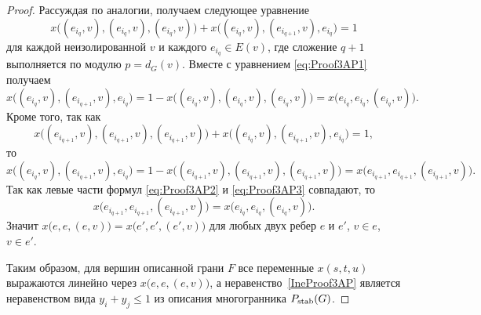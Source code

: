 \begin{proof}
	Рассуждая по аналогии, получаем следующее уравнение
	$$
	x\big( (e_{i_q},v), (e_{i_q},v), (e_{i_q},v) \big) 
	+ x\big( (e_{i_q},v), (e_{i_{q+1}},v), e_{i_q} \big) = 1
	$$ 
	для каждой неизолированной $v$ и каждого $e_{i_q} \in E(v)$,
	где сложение $q+1$ выполняется по модулю $p=d_G(v)$.
	Вместе с уравнением \eqref{eq:Proof3AP1} получаем
	\begin{equation}
	\label{eq:Proof3AP2}
	x\big( (e_{i_q},v), (e_{i_{q+1}},v), e_{i_q} \big) = 
	1 - x\big( (e_{i_q},v), (e_{i_q},v), (e_{i_q},v) \big) =
	x\big( e_{i_q}, e_{i_q}, (e_{i_q},v) \big).
	\end{equation}
	Кроме того, так как
	$$
	x\big( (e_{i_{q+1}},v), (e_{i_{q+1}},v), (e_{i_{q+1}},v) \big) 
	+ x\big( (e_{i_q},v), (e_{i_{q+1}},v), e_{i_q} \big) = 1,
	$$ 
	то
	\begin{equation}
	\label{eq:Proof3AP3}
	x\big( (e_{i_q},v), (e_{i_{q+1}},v), e_{i_q} \big) = 
	1 - x\big( (e_{i_{q+1}},v), (e_{i_{q+1}},v), (e_{i_{q+1}},v) \big) =
	x\big( e_{i_{q+1}}, e_{i_{q+1}}, (e_{i_{q+1}},v) \big).
	\end{equation}
	Так как левые части формул \eqref{eq:Proof3AP2} и \eqref{eq:Proof3AP3}
	совпадают, то
	$$
	x\big( e_{i_{q+1}}, e_{i_{q+1}}, (e_{i_{q+1}},v) \big) 
	= x\big( e_{i_q}, e_{i_q}, (e_{i_q},v) \big).
	$$ 
	Значит $x\big( e, e, (e,v) \big) = x\big( e', e', (e',v) \big)$
	для любых двух ребер $e$ и $e'$, $v \in e$, $v \in e'$.
	
	Таким образом, для вершин описанной грани $F$ все переменные $x(s,t,u)$
	выражаются линейно через $x\big( e, e, (e,v) \big)$,
	а неравенство~\eqref{IneProof3AP} является неравенством вида $y_i + y_j \le 1$ из описания многогранника $P_{\textup{stab}}(G)$.
\end{proof}


